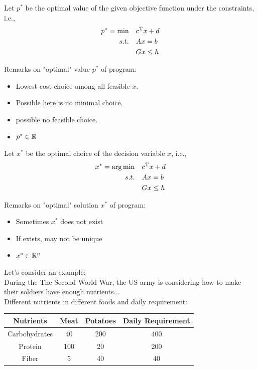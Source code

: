 \vspace{0.5cm}
Let $p^*$ be the optimal value of the given objective function under the constraints, i.e.,
\begin{align*}
	p^* = \min \quad &c^{{\rm T}}x + d\\
	s.t.\quad &Ax = b\\
	&Gx\leq h
\end{align*}

Remarks on "optimal" value $p^*$ of program:
\begin{itemize}
	\item Lowest cost choice among all feasible $x$.
	
	\item Possible here is no minimal choice.
	
	\item possible no feasible choice.
	
	\item $p^*\in \mathbb{R}$
\end{itemize}

\vspace{0.5cm}
Let $x^*$ be the optimal choice of the decision variable $x$, i.e.,
\begin{align*}
	x^* = \arg \min \quad&c^{{\rm T}}x + d\\
	s.t.\quad &Ax = b\\
	&Gx\leq h
\end{align*}

Remarks on "optimal" solution $x^*$ of program:
\begin{itemize}
	\item Sometimes $x^*$ does not exist
	
	\item If exists, may not be unique
	
	\item $x^*\in \mathbb{R}^n$
\end{itemize}




\vspace{0.5cm}
Let's consider an example:\\

During the The Second World War, the US army is considering how to make their soldiers have enough nutrients...\\

Different nutrients in different foods and daily requirement:
\begin{center}
	\begin{tabular}{|c|c|c|c|}
		\hline 
		Nutrients&Meat&Potatoes&Daily Requirement\\
		\hline  
		Carbohydrates&40&200&400\\
		\hline  
		Protein&100&20&200\\
		\hline  
		Fiber&5&40&40\\
		\hline 
	\end{tabular}
\end{center}


